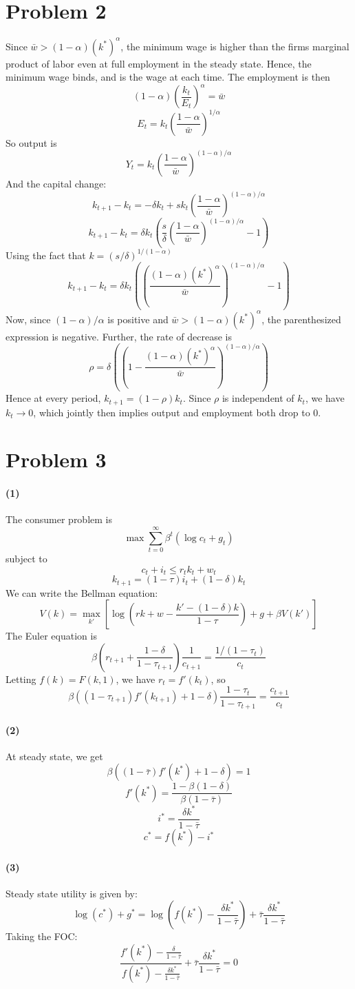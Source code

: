 \documentclass[10pt,letter]{article}
\newcommand{\problem}[1]{\section*{Problem #1}}
\newcommand{\problempart}[1]{\paragraph{#1}}
\begin{document}
\problem{2}
Since $\bar{w} > (1-\alpha)(k^*)^\alpha$, the minimum wage is higher than the firms marginal product of labor even at full employment in the steady state. Hence, the minimum wage binds, and is the wage at each time. The employment is then
\[ (1-\alpha)\left(\frac{k_t}{E_t}\right)^\alpha = \bar{w} \]
\[ E_t = k_t \left( \frac{1-\alpha}{\bar{w}} \right)^{1/\alpha}\]
So output is
\[ Y_t = k_t \left( \frac{1-\alpha}{\bar{w}} \right)^{(1-\alpha)/\alpha} \]
And the capital change:
\[ k_{t+1} - k_t = -\delta k_t + s k_t \left( \frac{1-\alpha}{\bar{w}} \right)^{(1-\alpha)/\alpha} \]
\[ k_{t+1} - k_t = \delta k_t \left(\frac{s}{\delta} \left( \frac{1-\alpha}{\bar{w}} \right)^{(1-\alpha)/\alpha} - 1\right) \]
Using the fact that $k = (s/\delta)^{1/(1-\alpha)}$
\[ k_{t+1} - k_t = \delta k_t \left(\left( \frac{(1-\alpha)(k^*)^\alpha}{\bar{w}} \right)^{(1-\alpha)/\alpha} - 1\right) \]
Now, since $(1-\alpha)/\alpha$ is positive and $\bar{w} > (1-\alpha)(k^*)^\alpha$, the parenthesized expression is negative. Further, the rate of decrease is
\[ \rho = \delta\left(\left(1 - \frac{(1-\alpha)(k^*)^\alpha}{\bar{w}} \right)^{(1-\alpha)/\alpha} \right) \]
Hence at every period, $k_{t+1} = (1-\rho) k_t$. Since $\rho$ is independent of $k_t$, we have $k_t \to 0$, which jointly then implies output and employment both drop to 0.
\pagebreak
\problem{3}
\problempart{(1)}
The consumer problem is
\[ \max \sum_{t=0}^\infty \beta^t (\log c_t + g_t) \]
subject to
\[ c_t + i_t \le r_t k_t + w_t \]
\[ k_{t+1} = (1-\tau)i_t + (1-\delta)k_t \]
We can write the Bellman equation:
\[ V(k) = \max_{k'} \left[ \log \left(r k + w - \frac{k' - (1-\delta)k}{1-\tau} \right) + g + \beta V(k') \right] \]
The Euler equation is
\[ \beta ( r_{t+1} + \frac{1-\delta}{1-\tau_{t+1}}) \frac{1}{c_{t+1}} = \frac{1/(1-\tau_t)}{c_t} \]
Letting $f(k) = F(k, 1)$, we have $r_t = f'(k_t)$, so
\[ \beta ( (1-\tau_{t+1})f'(k_{t+1}) + 1-\delta) \frac{1-\tau_t}{1-\tau_{t+1}} = \frac{c_{t+1}}{c_t} \]
\problempart{(2)}
At steady state, we get
\[ \beta ( (1-\bar{\tau})f'(k^*) + 1-\delta) = 1 \]
\[  f'(k^*) = \frac{1 - \beta(1-\delta)}{\beta(1-\bar{\tau})}  \]
\[ i^* = \frac{\delta k^*}{1 - \bar{\tau}}\]
\[ c^* = f(k^*) - i^* \]
\problempart{(3)}
Steady state utility is given by:
\[ \log(c^*) + g^* = \log\left( f(k^*) - \frac{\delta k^*}{1 - \bar{\tau}}\right) + \bar{\tau}\frac{\delta k^*}{1 - \bar{\tau}} \]
Taking the FOC:
\[ \frac{f'(k^*) - \frac{\delta}{1-\bar{\tau}}}{f(k^*) - \frac{\delta k^*}{1 - \bar{\tau}}} + \bar{\tau}\frac{\delta k^*}{1 - \bar{\tau}} = 0 \]
\end{document}

